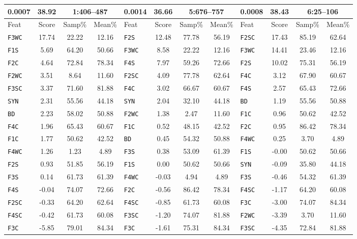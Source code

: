 \documentclass[11pt,a4paper]{scrartcl} %
\begin{document}
{\begin{table}[H]
{\begin{tabular}{ | l | c | c | c || l | c | c | c || l | c | c | c |}
0.0007 & 38.92 & \multicolumn{2}{c||}{ 1:406--487} & 0.0014 & 36.66 & \multicolumn{2}{c||}{ 5:676--757} & 0.0008 & 38.43 & \multicolumn{2}{c|}{ 6:25--106} \\

\hline
Feat & Score & Samp\% & Mean\% & Feat & Score & Samp\% & Mean\% & Feat & Score & Samp\% & Mean\% \\
\hline

\texttt{F3WC} & 17.74 & 22.22 & 12.16 & \texttt{F2S} & 12.48 & 77.78 & 56.19 & \texttt{F2SC} & 17.43 & 85.19 & 62.64 \\
\texttt{F1S} & 5.69 & 64.20 & 50.66 & \texttt{F3WC} & 8.58 & 22.22 & 12.16 & \texttt{F3WC} & 14.41 & 23.46 & 12.16 \\
\texttt{F2C} & 4.64 & 72.84 & 78.34 & \texttt{F4S} & 7.97 & 59.26 & 72.66 & \texttt{F2S} & 10.02 & 75.31 & 56.19 \\
\texttt{F2WC} & 3.51 & 8.64 & 11.60 & \texttt{F2SC} & 4.09 & 77.78 & 62.64 & \texttt{F4C} & 3.12 & 67.90 & 60.67 \\
\texttt{F3SC} & 3.37 & 71.60 & 81.88 & \texttt{F4C} & 3.02 & 66.67 & 60.67 & \texttt{F4S} & 2.57 & 65.43 & 72.66 \\
\texttt{SYN} & 2.31 & 55.56 & 44.18 & \texttt{SYN} & 2.04 & 32.10 & 44.18 & \texttt{BD} & 1.19 & 55.56 & 50.88 \\
\texttt{BD} & 2.23 & 58.02 & 50.88 & \texttt{F2WC} & 1.38 & 2.47 & 11.60 & \texttt{F1C} & 0.96 & 50.62 & 42.52 \\
\texttt{F4C} & 1.96 & 65.43 & 60.67 & \texttt{F1C} & 0.52 & 48.15 & 42.52 & \texttt{F2C} & 0.95 & 86.42 & 78.34 \\
\texttt{F1C} & 1.77 & 50.62 & 42.52 & \texttt{BD} & 0.45 & 54.32 & 50.88 & \texttt{F4WC} & 0.25 & 3.70 & 4.89 \\
\texttt{F4WC} & 1.26 & 1.23 & 4.89 & \texttt{F3S} & 0.38 & 53.09 & 61.39 & \texttt{F1S} & -0.00 & 50.62 & 50.66 \\
\texttt{F2S} & 0.93 & 51.85 & 56.19 & \texttt{F1S} & 0.00 & 50.62 & 50.66 & \texttt{SYN} & -0.09 & 35.80 & 44.18 \\
\texttt{F3S} & 0.14 & 61.73 & 61.39 & \texttt{F4WC} & -0.03 & 4.94 & 4.89 & \texttt{F3S} & -0.46 & 54.32 & 61.39 \\
\texttt{F4S} & -0.04 & 74.07 & 72.66 & \texttt{F2C} & -0.56 & 86.42 & 78.34 & \texttt{F4SC} & -1.17 & 64.20 & 60.08 \\
\texttt{F2SC} & -0.33 & 64.20 & 62.64 & \texttt{F4SC} & -0.85 & 61.73 & 60.08 & \texttt{F3C} & -3.00 & 74.07 & 84.34 \\
\texttt{F4SC} & -0.42 & 61.73 & 60.08 & \texttt{F3SC} & -1.20 & 74.07 & 81.88 & \texttt{F2WC} & -3.39 & 3.70 & 11.60 \\
\texttt{F3C} & -5.85 & 79.01 & 84.34 & \texttt{F3C} & -1.61 & 75.31 & 84.34 & \texttt{F3SC} & -4.35 & 72.84 & 81.88 \\


\end{tabular}}
\end{table}}
\end{document}
